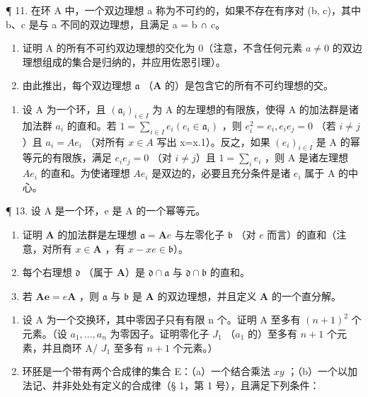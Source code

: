 ¶ 11. 在环 A 中，一个双边理想 a 称为不可约的，如果不存在有序对 (b, c)，其中 b、c 是与 a 不同的双边理想，且满足 a = b ∩ c。

\begin{enumerate}
\def\labelenumi{(\alph{enumi})}
\item
  证明 A 的所有不可约双边理想的交化为 0（注意，不含任何元素 \(a \neq 0\) 的双边理想组成的集合是归纳的，并应用佐恩引理）。
\item
  由此推出，每个双边理想 \(\mathfrak{a}\) （\(\mathbf{A}\) 的）是包含它的所有不可约理想的交。
\end{enumerate}

\begin{enumerate}
\def\labelenumi{\arabic{enumi}.}
\setcounter{enumi}{11}
\tightlist
\item
  设 A 为一个环，且 \((\mathfrak{a}_{i})_{i\in I}\) 为 A 的左理想的有限族，使得 A 的加法群是诸加法群 \(a_{i}\) 的直和。若 \(1=\sum_{i\in I}e_{i}(e_{i}\in\mathfrak{a}_{i})\) ，则 \(e_{i}^{2}=e_{i}, e_{i}e_{j}=0\) （若 \(i\neq j\)）且 \(a_{i}=Ae_{i}\) （对所有 \(x\in A\) 写出 x=x.1）。反之，如果 \((e_{i})_{i\in I}\) 是 A 的幂等元的有限族，满足 \(e_{i}e_{j}=0\) （对 \(i\neq j\)）且 \(1=\sum_{i}e_{i}\) ，则 A 是诸左理想 \(Ae_{i}\) 的直和。为使诸理想 \(Ae_{i}\) 是双边的，必要且充分条件是诸 \(e_{i}\) 属于 A 的中心。
\end{enumerate}

¶ 13. 设 A 是一个环，e 是 A 的一个幂等元。

\begin{enumerate}
\def\labelenumi{(\alph{enumi})}
\item
  证明 \(\mathbf{A}\) 的加法群是左理想 \(\mathfrak{a} = \mathbf{A}e\) 与左零化子 \(\mathfrak{b}\) （对 \(e\) 而言）的直和（注意，对所有 \(x\in \mathbf{A}\) ，有 \(x - xe\in \mathfrak{b}\)）。
\item
  每个右理想 \(\mathfrak{d}\) （属于 \(\mathbf{A}\)）是 \(\mathfrak{d} \cap \mathfrak{a}\) 与 \(\mathfrak{d} \cap \mathfrak{b}\) 的直和。
\item
  若 \(\mathbf{Ae} = e\mathbf{A}\) ，则 \(\mathfrak{a}\) 与 \(\mathfrak{b}\) 是 \(\mathbf{A}\) 的双边理想，并且定义 \(\mathbf{A}\) 的一个直分解。
\end{enumerate}

\begin{enumerate}
\def\labelenumi{\arabic{enumi}.}
\setcounter{enumi}{13}
\item
  设 A 为一个交换环，其中零因子只有有限 n 个。证明 A 至多有 \((n+1)^{2}\) 个元素。（设 \(a_{1},\ldots,a_{n}\) 为零因子。证明零化子 \(J_{1}\) （\(a_{1}\) 的）至多有 \(n+1\) 个元素，并且商环 A/ \(J_{1}\) 至多有 \(n+1\) 个元素。）
\item
  环胚是一个带有两个合成律的集合 E：（a）一个结合乘法 \(xy\) ；（b）一个以加法记、并非处处有定义的合成律（§ 1，第 1 号），且满足下列条件：
\end{enumerate}

